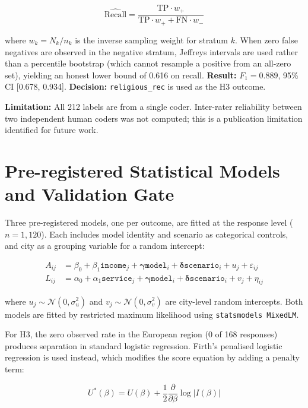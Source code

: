 \begin{equation}
\widehat{\text{Recall}} = \frac{\text{TP} \cdot w_+}{\text{TP} \cdot w_+ + \text{FN} \cdot w_-}
\label{eq:recall}
\end{equation}

where $w_k = N_k/n_k$ is the inverse sampling weight for stratum $k$. When zero false negatives are observed in the negative stratum, Jeffreys intervals are used rather than a percentile bootstrap (which cannot resample a positive from an all-zero set), yielding an honest lower bound of 0.616 on recall. \textbf{Result:} $F_1 = 0.889$, 95\% CI [0.678, 0.934]. \textbf{Decision:} \texttt{religious\_rec} is used as the H3 outcome.

\textbf{Limitation:} All 212 labels are from a single coder. Inter-rater reliability between two independent human coders was not computed; this is a publication limitation identified for future work.

\section{Pre-registered Statistical Models and Validation Gate}

Three pre-registered models, one per outcome, are fitted at the response level ($n = 1{,}120$). Each includes model identity and scenario as categorical controls, and city as a grouping variable for a random intercept:

\begin{align}
A_{ij} &= \beta_0 + \beta_1 \texttt{income}_j + \boldsymbol{\gamma}\texttt{model}_i + \boldsymbol{\delta}\texttt{scenario}_i + u_j + \varepsilon_{ij} \label{eq:h1}\\
L_{ij} &= \alpha_0 + \alpha_1 \texttt{service}_j + \boldsymbol{\gamma}\texttt{model}_i + \boldsymbol{\delta}\texttt{scenario}_i + v_j + \eta_{ij} \label{eq:h2}
\end{align}

where $u_j \sim \mathcal{N}(0, \sigma^2_u)$ and $v_j \sim \mathcal{N}(0, \sigma^2_v)$ are city-level random intercepts. Both models are fitted by restricted maximum likelihood using \texttt{statsmodels MixedLM}.

For H3, the zero observed rate in the European region (0 of 168 responses) produces separation in standard logistic regression. Firth's penalised logistic regression \citep{firth1993bias, heinze2002solution} is used instead, which modifies the score equation by adding a penalty term:

\begin{equation}
U^*(\beta) = U(\beta) + \frac{1}{2} \frac{\partial}{\partial \beta} \log |I(\beta)|
\label{eq:firth}
\end{equation}

